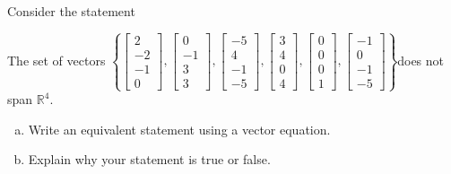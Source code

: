 
\begin{exerciseStatement}


Consider the statement 
\begin{center}\begin{minipage}{0.8\textwidth}
 The set of vectors \( \left\{ \left[\begin{array}{c}
2 \\
-2 \\
-1 \\
0
\end{array}\right] , \left[\begin{array}{c}
0 \\
-1 \\
3 \\
3
\end{array}\right] , \left[\begin{array}{c}
-5 \\
4 \\
-1 \\
-5
\end{array}\right] , \left[\begin{array}{c}
3 \\
4 \\
0 \\
4
\end{array}\right] , \left[\begin{array}{c}
0 \\
0 \\
0 \\
1
\end{array}\right] , \left[\begin{array}{c}
-1 \\
0 \\
-1 \\
-5
\end{array}\right] \right\} \)does not span \(\mathbb{R}^4\). 
\end{minipage}\end{center}
    


\begin{enumerate}[(a)]
\item  Write an equivalent statement using a vector equation.
\item  Explain why your statement is true or false.
\end{enumerate}
    
\end{exerciseStatement}
    
